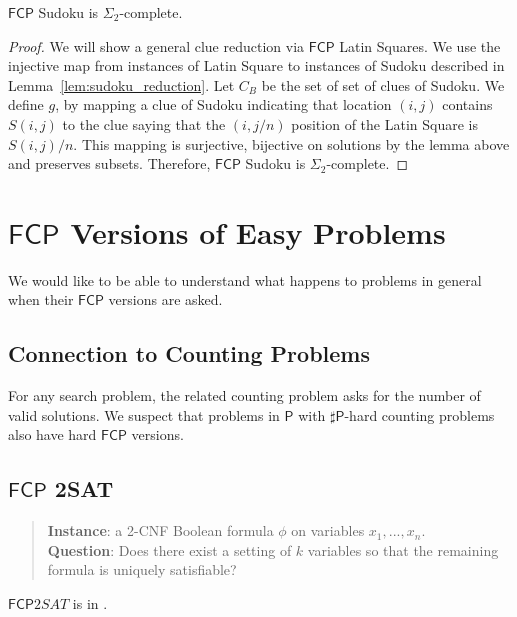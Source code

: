 \documentclass[runningheads,a4paper]{llncs}
\begin{document}
\begin{lemma} 
$\mathsf{FCP}$ Sudoku is $\Sigma_2$-complete.
\end{lemma}

\begin{proof} 
We will show a general clue reduction via $\mathsf{FCP}$ Latin Squares. We use the injective map from instances of Latin Square to instances of Sudoku described in Lemma~\ref{lem:sudoku_reduction}. Let $C_B$ be the set of set of clues of Sudoku. We define $g$, by mapping a clue of Sudoku indicating that location $(i,j)$ contains $S(i,j)$ to the clue saying that the $(i, j/n)$ position of the Latin Square is $S(i, j)/n$. This mapping is surjective, bijective on solutions by the lemma above and preserves subsets. Therefore, $\mathsf{FCP}$ Sudoku is $\Sigma_2$-complete. 
\end{proof}

\section{$\mathsf{FCP}$ Versions of Easy Problems}
\label{sec:easyproblems}

We would like to be able to understand what happens to problems in general when their $\mathsf{FCP}$ versions are asked.

\subsection{Connection to Counting Problems}

For any search problem, the related counting problem asks for the number of valid solutions. We suspect that problems in $\mathsf{P}$ with $\sharp \mathsf{P}$-hard counting problems also have hard $\mathsf{FCP}$ versions.

\subsection{$\mathsf{FCP}$ 2SAT} 

\begin{quote}
\textbf{Instance}: a 2-CNF Boolean formula $\phi$ on variables $x_1, ..., x_n$. \\
\textbf{Question}: Does there exist a setting of $k$ variables so that the remaining formula is uniquely satisfiable?
\end{quote}

\begin{proposition}
$\mathsf{FCP} 2SAT$ is in \NP.
\end{proposition}
\end{document}
